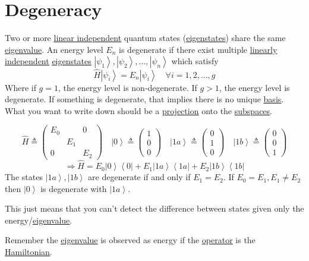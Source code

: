 \documentclass[
]{article}
\let\oldhyperref\hyperref
\renewcommand{\hyperref}[2][]{\oldhyperref[#1]{\underline{#2}}}
\providecommand{\ket}[1]{\left\lvert #1 \right\rangle}
\providecommand{\bra}[1]{\left\langle #1 \right\rvert}
\providecommand{\Rarr}{\Rightarrow}
\begin{document}
\section{Degeneracy}\label{degeneracy}
Two or more \hyperref[linear-independence]{linear independent} quantum states (\hyperref[eigenstates]{eigenstates}) share the same \hyperref[eigenvectorseigenvalues]{eigenvalue}.
An energy level \(E_n\) is degenerate if there exist multiple \hyperref[linear-independence]{linearly independent} \hyperref[eigenstates]{eigenstates} \(\ket{\psi_1}, \ket{\psi_2}, \ldots, \ket{\psi_n}\) which satisfy
\[
	\hat{H}\ket{\psi_i}=E_n\ket{\psi_i}\quad \forall i=1,2,\ldots,g
\]
Where if \(g=1\), the energy level is non-degenerate.
If \(g>1\), the energy level is degenerate.
If something is degenerate, that implies there is no unique \hyperref[basis-states]{basis}. What you want to write down should be a \hyperref[projections]{projection} onto the \hyperref[subspaces]{subspaces}.

\[
	\hat{H}\triangleq\begin{pmatrix}
		E_0 &     & 0   \\
		    & E_1 &     \\
		0   &     & E_2
	\end{pmatrix}
	\quad \ket{0}\triangleq\begin{pmatrix}1 \\ 0 \\ 0\end{pmatrix}
	\quad \ket{1a}\triangleq\begin{pmatrix}0 \\ 1 \\ 0\end{pmatrix}
	\quad \ket{1b}\triangleq\begin{pmatrix}0 \\ 0 \\ 1\end{pmatrix}
\]
\[
	\Rarr \hat{H}=E_0\ket{0}\bra{0}+E_1\ket{1a}\bra{1a}+E_2\ket{1b}\bra{1b}
\]
The states \(\ket{1a},\ket{1b}\) are degenerate if and only if \(E_1=E_2\). If \(E_0=E_1, E_1\neq E_2\) then \(\ket{0}\) is degenerate with \(\ket{1a}\).

This just means that you can't detect the difference between states given only the energy/\hyperref[eigenvectorseigenvalues]{eigenvalue}.

Remember the \hyperref[eigenvectorseigenvalues]{eigenvalue} is observed as energy if the  \hyperref[operators]{operator} is the \hyperref[schruxf6dingers-equation-hamiltonian]{Hamiltonian}.
\end{document}
